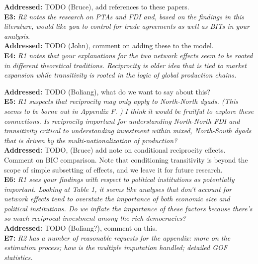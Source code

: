 \documentclass[a4paper,11pt]{texMemo}
\begin{document}
\noindent \textbf{Addressed:} TODO  (Bruce), add references to these papers. \\

\noindent \textbf{E3:} \emph{R2 notes the research on PTAs and FDI and, based on the findings in this literature, would like you to control for trade agreements as well as BITs in your analysis}.\\

\noindent \textbf{Addressed:} TODO (John), comment on adding these to the model. \\

\noindent \textbf{E4:} \emph{R1 notes that your explanations for the two network effects seem to be rooted in different theoretical traditions. Reciprocity is older idea that is tied to market expansion while transitivity is rooted in the logic of global production chains.} 

\noindent \textbf{Addressed:}  TODO (Boliang), what  do we want to say about this?\\

\noindent \textbf{E5:} \emph{R1 suspects that reciprocity may only apply to North-North dyads. (This seems to be borne out in Appendix F. ) I think it would be fruitful to explore these connections. Is reciprocity important for understanding North-North FDI and transitivity critical to understanding investment within mixed, North-South dyads that is driven by the multi-nationalization of production?}\\

\noindent \textbf{Addressed:} TODO,  (Bruce) add note on conditional reciprocity effects. Comment on BIC comparison. Note that conditioning transitivity is beyond the scope of simple  subsetting of effects, and we leave it for future research. \\

\noindent \textbf{E6:} \emph{R1 sees your findings with respect to political institutions as potentially important. Looking at Table 1, it seems like analyses that don't account for network effects tend to overstate the importance of both economic size and political institutions. Do we inflate the importance of these factors because there's so much reciprocal investment among the rich democracies?}\\

\noindent \textbf{Addressed:} TODO (Boliang?), comment on this.  \\

\noindent \textbf{E7:} \emph{R2 has a number of reasonable requests for the appendix: more on the estimation process; how is the multiple imputation handled; detailed GOF statistics.}\\
\end{document}
